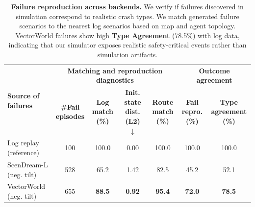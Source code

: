 \documentclass{article}
\newcommand{\best}[1]{\textbf{#1}}
\theoremstyle{plain}
\theoremstyle{definition}
\theoremstyle{remark}
\begin{document}
\begin{table}[t]
\centering
\small
\caption{\textbf{Failure reproduction across backends.}
We verify if failures discovered in simulation correspond to realistic crash types.
We match generated failure scenarios to the nearest log scenarios based on map and agent topology.
VectorWorld failures show high \textbf{Type Agreement} (78.5\%) with log data, indicating that our simulator exposes realistic safety-critical events rather than simulation artifacts.}
\label{tab:app-failure-repro}
\setlength{\tabcolsep}{6.0pt}
\renewcommand{\arraystretch}{1.1}
\begin{threeparttable}
\begin{tabular}{@{}l cccc cc@{}}
\toprule
\multirow{2}{*}{\textbf{Source of failures}}
& \multicolumn{4}{c}{\textbf{Matching and reproduction diagnostics}}
& \multicolumn{2}{c}{\textbf{Outcome agreement}} \\
\cmidrule(lr){2-5}\cmidrule(lr){6-7}
& \makecell{\textbf{\#Fail}\\\textbf{episodes}}
& \makecell{\textbf{Log}\\\textbf{match (\%)}} 
& \makecell{\textbf{Init.}\\\textbf{state dist.}\\\textbf{(L2) \(\downarrow\)}} 
& \makecell{\textbf{Route}\\\textbf{match (\%)}} 
& \makecell{\textbf{Fail}\\\textbf{repro. (\%)}} 
& \makecell{\textbf{Type}\\\textbf{agreement (\%)}} \\
\midrule
Log replay (reference)  & 100 & 100.0 & 0.00 & 100.0 & 100.0 & 100.0 \\
ScenDream-L (neg. tilt) & 528 & 65.2 & 1.42 & 82.5 & 45.2 & 52.1 \\
\rowcolor{oursrow}
VectorWorld (neg. tilt) & 655 & \best{88.5} & \best{0.92} & \best{95.4} & \best{72.0} & \best{78.5} \\
\bottomrule
\end{tabular}
\end{threeparttable}
\end{table}
\end{document}
